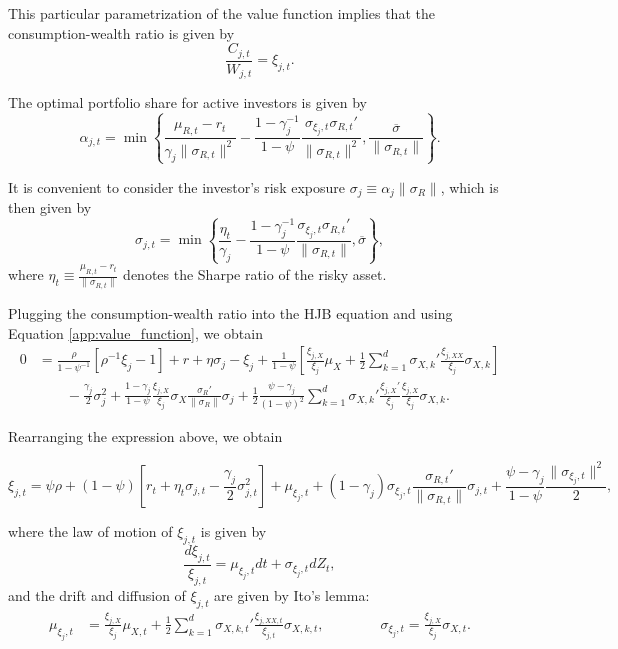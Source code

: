 This particular parametrization of the value function implies that the consumption-wealth ratio is given by
\begin{equation}
    \frac{C_{j,t}}{W_{j,t}} = \xi_{j,t}.
\end{equation}

The optimal portfolio share for active investors is given by
\begin{equation}
    \alpha_{j,t}
    = \min \left\{ \frac{\mu_{R,t}-r_t}{\gamma_j \|\sigma_{R,t}\|^2}  - \frac{1-\gamma_j^{-1}}{1-\psi} \frac{\sigma_{\xi_j,t} \sigma_{R,t}'}{\|\sigma_{R,t}\|^2}, \frac{\overline{\sigma}}{\|\sigma_{R,t}\|} \right\}.
\end{equation}

It is convenient to consider the investor's risk exposure $\sigma_{j} \equiv  \alpha_j \|\sigma_R\|$, which is then given by
\begin{equation}
    \sigma_{j,t} = \min \left\{ \frac{\eta_t}{\gamma_j}  - \frac{1-\gamma_j^{-1}}{1-\psi} \frac{\sigma_{\xi_j,t} \sigma_{R,t}'}{\|\sigma_{R,t}\|}, \overline{\sigma} \right\},
\end{equation}
where $\eta_t \equiv \frac{\mu_{R,t} - r_t}{\|\sigma_{R,t}\|}$ denotes the Sharpe ratio of the risky asset.

Plugging the consumption-wealth ratio into the HJB equation and using Equation \eqref{app:value_function}, we obtain
\begin{align}
    0 &=  \frac{\rho   }{1-\psi^{-1}} \left[  \rho^{-1} \xi_j-1 \right] + r  + \eta \sigma_j   - \xi_j + \frac{1}{1-\psi} \left[ \frac{\xi_{j,X}}{\xi_j} \mu_X + \frac{1}{2} \sum_{k=1}^d \sigma_{X,k}' \frac{\xi_{j,XX}}{\xi_j} \sigma_{X,k}\right]\nonumber\\
    &\qquad - \frac{\gamma_j}{2} \sigma_j^2  + \frac{1-\gamma_j}{1-\psi} \frac{\xi_{j,X}}{\xi_j} \sigma_X \frac{\sigma_R'}{\|\sigma_R\|} \sigma_j    + \frac{1}{2} \frac{\psi-\gamma_j}{(1-\psi)^2} \sum_{k=1}^d \sigma_{X,k}' \frac{\xi_{j,X}'}{\xi_j} \frac{\xi_{j,X}}{\xi_j} \sigma_{X,k}.
\end{align}

Rearranging the expression above, we obtain
\begin{small}
\begin{equation}
    \xi_{j,t} = \psi \rho + (1-\psi) \left[ r_t + \eta_t \sigma_{j,t} - \frac{\gamma_j}{2} \sigma_{j,t}^2 \right] + \mu_{\xi_j,t} + (1-\gamma_j)  \sigma_{\xi_j,t} \frac{\sigma_{R,t}'}{\|\sigma_{R,t}\|} \sigma_{j,t} + \frac{\psi - \gamma_j}{1-\psi} \frac{\|\sigma_{\xi_j,t} \|^2}{2},
\end{equation}
\end{small}
where the law of motion of $\xi_{j,t}$ is given by
\begin{equation}
    \frac{d \xi_{j,t}}{\xi_{j,t}} = \mu_{\xi_j,t} dt + \sigma_{\xi_j,t} d Z_t,
\end{equation}
and the drift and diffusion of $\xi_{j,t}$ are given by Ito's lemma:
\begin{align}
    \mu_{\xi_j,t} &= \frac{\xi_{j,X}}{\xi_j} \mu_{X,t} + \frac{1}{2} \sum_{k=1}^d \sigma_{X,k,t}' \frac{\xi_{j,XX,t}}{\xi_{j,t}} \sigma_{X,k,t}, \qquad \qquad 
    \sigma_{\xi_j,t} = \frac{\xi_{j,X}}{\xi_j} \sigma_{X,t}.
\end{align}


